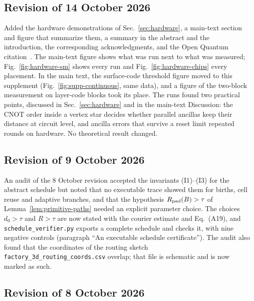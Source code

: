 \documentclass[aps,prx,reprint,superscriptaddress,nofootinbib,floatfix,longbibliography]{revtex4-2}
\theoremstyle{definition}
\begin{document}
\subsection{Revision of 14 October 2026}
Added the hardware demonstrations of Sec.~\ref{sec:hardware}, a main-text
section and figure that summarize them, a summary in the abstract and the
introduction, the corresponding acknowledgments, and the Open Quantum
citation~\cite{OpenQuantum2026}.  The main-text figure shows what was run
next to what was measured; Fig.~\ref{fig:hardware-sm} shows every run and
Fig.~\ref{fig:hardware-chips} every placement.  In the main text, the
surface-code threshold figure moved to this supplement
(Fig.~\ref{fig:supp-continuous}, same data), and a figure of the two-block
measurement on layer-code blocks took its place.  The runs found two practical points,
discussed in Sec.~\ref{sec:hardware} and in the main-text Discussion: the CNOT
order inside a vertex star decides
whether parallel ancillas keep their distance at circuit level, and ancilla
errors that survive a reset limit repeated rounds on hardware.  No
theoretical result changed.

\subsection{Revision of 9 October 2026}
An audit of the 8 October revision accepted the invariants (I1)--(I3) for the
abstract schedule but noted that no executable trace showed them for births,
cell reuse and adaptive branches, and that the hypothesis
$R_{\rm pad}(B)>\tau$ of Lemma~\ref{lem:primitive-paths} needed an explicit
parameter choice.  The choices $d_0>\tau$ and $R>\tau$ are now stated with
the courier estimate and Eq.~(A19), and \texttt{schedule\_verifier.py}
exports a complete schedule and checks it, with nine negative controls
(paragraph ``An executable schedule certificate'').  The audit also found that
the coordinates of the routing sketch \texttt{factory\_3d\_routing\_coords.csv}
overlap; that file is schematic and is now marked as such.

\subsection{Revision of 8 October 2026}
\end{document}
